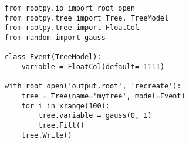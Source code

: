 \begin{footnotesize}
\begin{verbatim}
from rootpy.io import root_open
from rootpy.tree import Tree, TreeModel
from rootpy.tree import FloatCol
from random import gauss

class Event(TreeModel):
    variable = FloatCol(default=-1111)

with root_open('output.root', 'recreate'):
    tree = Tree(name='mytree', model=Event)
    for i in xrange(100):
        tree.variable = gauss(0, 1)
        tree.Fill()
    tree.Write()
\end{verbatim}
\end{footnotesize}
